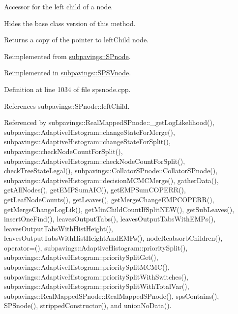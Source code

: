 \-Accessor for the left child of a node. 

\-Hides the base class version of this method.

\-Returns a copy of the pointer to left\-Child node. 

\-Reimplemented from \hyperlink{classsubpavings_1_1SPnode_a2ae7370c24e6c51a99c8bd29b2ffcec3}{subpavings\-::\-S\-Pnode}.



\-Reimplemented in \hyperlink{classsubpavings_1_1SPSVnode_a3ef0b662df21eb88689644cb5d1279d2}{subpavings\-::\-S\-P\-S\-Vnode}.



\-Definition at line 1034 of file spsnode.\-cpp.



\-References subpavings\-::\-S\-Pnode\-::left\-Child.



\-Referenced by subpavings\-::\-Real\-Mapped\-S\-Pnode\-::\-\_\-get\-Log\-Likelihood(), subpavings\-::\-Adaptive\-Histogram\-::change\-State\-For\-Merge(), subpavings\-::\-Adaptive\-Histogram\-::change\-State\-For\-Split(), subpavings\-::check\-Node\-Count\-For\-Split(), subpavings\-::\-Adaptive\-Histogram\-::check\-Node\-Count\-For\-Split(), check\-Tree\-State\-Legal(), subpavings\-::\-Collator\-S\-Pnode\-::\-Collator\-S\-Pnode(), subpavings\-::\-Adaptive\-Histogram\-::decision\-M\-C\-M\-C\-Merge(), gather\-Data(), get\-All\-Nodes(), get\-E\-M\-P\-Sum\-A\-I\-C(), get\-E\-M\-P\-Sum\-C\-O\-P\-E\-R\-R(), get\-Leaf\-Node\-Counts(), get\-Leaves(), get\-Merge\-Change\-E\-M\-P\-C\-O\-P\-E\-R\-R(), get\-Merge\-Change\-Log\-Lik(), get\-Min\-Child\-Count\-If\-Split\-N\-E\-W(), get\-Sub\-Leaves(), insert\-One\-Find(), leaves\-Output\-Tabs(), leaves\-Output\-Tabs\-With\-E\-M\-Ps(), leaves\-Output\-Tabs\-With\-Hist\-Height(), leaves\-Output\-Tabs\-With\-Hist\-Height\-And\-E\-M\-Ps(), node\-Reabsorb\-Children(), operator=(), subpavings\-::\-Adaptive\-Histogram\-::priority\-Split(), subpavings\-::\-Adaptive\-Histogram\-::priority\-Split\-Get(), subpavings\-::\-Adaptive\-Histogram\-::priority\-Split\-M\-C\-M\-C(), subpavings\-::\-Adaptive\-Histogram\-::priority\-Split\-With\-Switches(), subpavings\-::\-Adaptive\-Histogram\-::priority\-Split\-With\-Total\-Var(), subpavings\-::\-Real\-Mapped\-S\-Pnode\-::\-Real\-Mapped\-S\-Pnode(), sps\-Contains(), \-S\-P\-Snode(), stripped\-Constructor(), and union\-No\-Data().


